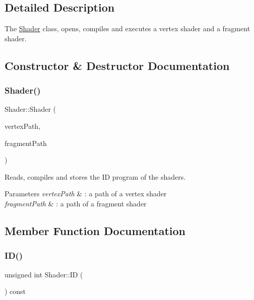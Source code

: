\subsection{Detailed Description}
The \mbox{\hyperlink{class_shader}{Shader}} class, opens, compiles and executes a vertex shader and a fragment shader. 

\subsection{Constructor \& Destructor Documentation}
\mbox{\label{class_shader_a03421a8419cdad4b84cf58ecdb156879}} 
\subsubsection{\texorpdfstring{Shader()}{Shader()}}
{\footnotesize\ttfamily Shader\+::\+Shader (\begin{DoxyParamCaption}\item[{const G\+Lchar $\ast$}]{vertex\+Path,  }\item[{const G\+Lchar $\ast$}]{fragment\+Path }\end{DoxyParamCaption})}



Reads, compiles and stores the ID program of the shaders. 


\begin{DoxyParams}{Parameters}
{\em vertex\+Path} & \+: a path of a vertex shader \\
\hline
{\em fragment\+Path} & \+: a path of a fragment shader \\
\hline
\end{DoxyParams}


\subsection{Member Function Documentation}
\mbox{\label{class_shader_a23a569879e4ede84a052c0d3a12ae3c0}} 
\subsubsection{\texorpdfstring{I\+D()}{ID()}}
{\footnotesize\ttfamily unsigned int Shader\+::\+ID (\begin{DoxyParamCaption}{ }\end{DoxyParamCaption}) const}



